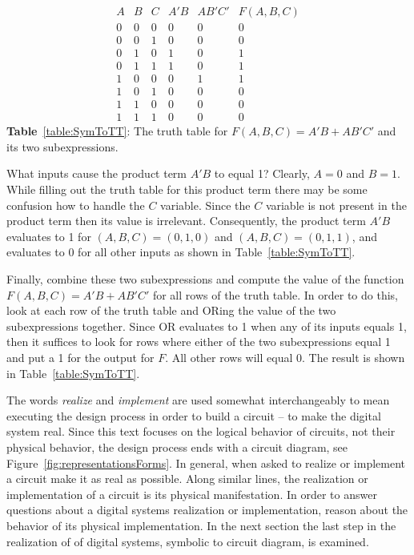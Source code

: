 $$
\begin{array}{c|c|c||c|c||c}
A & B & C & A'B & AB'C' & F(A,B,C) \\ \hline \hline
0 & 0 & 0 & 0  &  0 &  0  \\ \hline
0 & 0 & 1 & 0  &  0 &  0  \\ \hline
0 & 1 & 0 & 1  &  0 &  1  \\ \hline
0 & 1 & 1 & 1  &  0 &  1  \\ \hline
1 & 0 & 0 & 0  &  1 &  1  \\ \hline
1 & 0 & 1 & 0  &  0 &  0  \\ \hline
1 & 1 & 0 & 0  &  0 &  0  \\ \hline
1 & 1 & 1 & 0  &  0 &  0
\end{array} $$
\textbf{Table}~\ref{table:SymToTT}: The truth table for $F(A,B,C) = A'B + AB'C'$ and its  two subexpressions.

What inputs cause the product term $A'B$ to equal 1?  Clearly, $A=0$ and $B=1$.
While filling out the truth table for this product term there may be some
confusion
how to handle the $C$ variable.  Since the $C$ variable is not present in the
product term then its value is irrelevant. Consequently, the product term $A'B$
evaluates to 1 for $(A,B,C)=(0,1,0)$ and $(A,B,C)=(0,1,1)$, and evaluates to 0
for all other inputs as shown in Table~\ref{table:SymToTT}.

Finally, combine these two subexpressions and compute the value
of the function $F(A,B,C) = A'B + AB'C'$ for all rows of the truth table. In
order to do this, look at each row of the truth table and ORing the value of
the two
subexpressions together.  Since OR evaluates to 1 when any of its inputs equals
1, then it suffices to look for rows where either of the two subexpressions equal
1 and put a 1 for the output for $F$.  All other rows will equal 0.  The result
is shown in Table~\ref{table:SymToTT}.

The words \textit{ realize} and \textit{implement}  
are used somewhat interchangeably to mean executing the design
process in order to build a circuit -- to make the digital system real.
Since this text focuses on the logical
behavior of circuits, not their physical behavior, the design process ends with
a circuit diagram, see Figure~\ref{fig:representationsForms}.  In general, when asked
to realize or implement a circuit make it as real as
possible.  Along similar lines, the realization or implementation of a circuit
is its physical manifestation.  In order to answer questions about a
digital systems realization or implementation, reason about the behavior of its
physical implementation.  In the next section the last step in the realization
of of digital systems, symbolic to circuit diagram, is examined.


